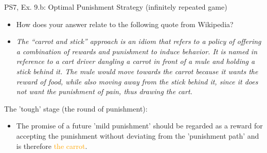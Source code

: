 \begin{frame}{PS7, Ex. 9.b: Optimal Punishment Strategy (infinitely repeated game)}
  \begin{itemize}
    \item[(b)] How does your answer relate to the following quote from Wikipedia?
    \item[] \textit{The “carrot and stick” approach is an idiom that refers to a policy of offering a combination of rewards and punishment to induce behavior. It is named in reference to a cart driver dangling a carrot in front of a mule and holding a stick behind it. The mule would move towards the carrot because it wants the reward of food, while also moving away from the stick behind it, since it does not want the punishment of pain, thus drawing the cart.}
  \end{itemize}
  \vspace{-4pt}
  \begin{multicols}{2}
    The 'tough' stage (the  round of punishment):
    \begin{itemize}
      \item The promise of a future 'mild punishment' should be regarded as a reward for accepting the punishment without deviating from the 'punishment path' and is therefore \textcolor{orange}{the carrot}.
    \end{itemize}
    \vfill\null\columnbreak
    \vfill\null
  \end{multicols}
\end{frame}
